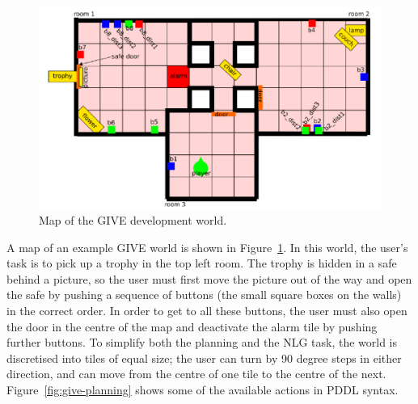 \begin{figure}
\centering
\includegraphics[width=1 \columnwidth]{give_world_2}
\caption{Map of the GIVE development world.}
  \label{fig:give-development-world}
\end{figure}

A map of an example GIVE world is shown in
Figure~\ref{fig:give-development-world}.  In this world, the user's
task is to pick up a trophy in the top left room.  The trophy is
hidden in a safe behind a picture, so the user must first move the
picture out of the way and open the safe by pushing a sequence of
buttons (the small square boxes on the walls) in the correct order.
In order to get to all these buttons, the user must also open the door
in the centre of the map and deactivate the alarm tile by pushing
further buttons.  To simplify both the planning and the NLG task, the
world is discretised into tiles of equal size; the user can turn by 90
degree steps in either direction, and can move from the centre of one
tile to the centre of the next. Figure~\ref{fig:give-planning} shows
some of the available actions in PDDL syntax.

